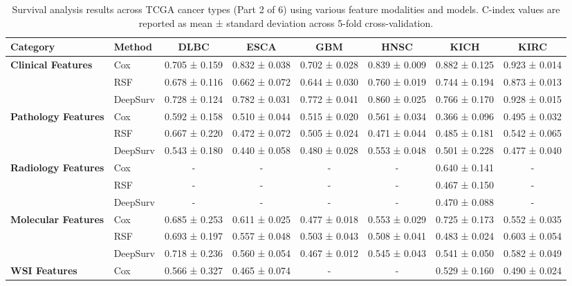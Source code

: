 \begin{sidewaystable}[htbp]
    \centering
    \caption{Survival analysis results across TCGA cancer types (Part 2 of 6) using various feature modalities and models. C-index values are reported as mean ± standard deviation across 5-fold cross-validation.}
    \label{tab:survival_results_2}
    \begin{tabular}{@{}llcccccc@{}}
        \toprule
        \textbf{Category} & \textbf{Method} & \textbf{DLBC} & \textbf{ESCA} & \textbf{GBM} & \textbf{HNSC} & \textbf{KICH} & \textbf{KIRC} \\
        \midrule
        \multirow{3}{*}{\textbf{Clinical Features}} & Cox & 0.705 ± 0.159 & 0.832 ± 0.038 & 0.702 ± 0.028 & 0.839 ± 0.009 & 0.882 ± 0.125 & 0.923 ± 0.014 \\
        & RSF & 0.678 ± 0.116 & 0.662 ± 0.072 & 0.644 ± 0.030 & 0.760 ± 0.019 & 0.744 ± 0.194 & 0.873 ± 0.013 \\
        & DeepSurv & 0.728 ± 0.124 & 0.782 ± 0.031 & 0.772 ± 0.041 & 0.860 ± 0.025 & 0.766 ± 0.170 & 0.928 ± 0.015 \\
        \midrule
        \multirow{3}{*}{\textbf{Pathology Features}} & Cox & 0.592 ± 0.158 & 0.510 ± 0.044 & 0.515 ± 0.020 & 0.561 ± 0.034 & 0.366 ± 0.096 & 0.495 ± 0.032 \\
        & RSF & 0.667 ± 0.220 & 0.472 ± 0.072 & 0.505 ± 0.024 & 0.471 ± 0.044 & 0.485 ± 0.181 & 0.542 ± 0.065 \\
        & DeepSurv & 0.543 ± 0.180 & 0.440 ± 0.058 & 0.480 ± 0.028 & 0.553 ± 0.048 & 0.501 ± 0.228 & 0.477 ± 0.040 \\
        \midrule
        \multirow{3}{*}{\textbf{Radiology Features}} & Cox & - & - & - & - & 0.640 ± 0.141 & - \\
        & RSF & - & - & - & - & 0.467 ± 0.150 & - \\
        & DeepSurv & - & - & - & - & 0.470 ± 0.088 & - \\
        \midrule
        \multirow{3}{*}{\textbf{Molecular Features}} & Cox & 0.685 ± 0.253 & 0.611 ± 0.025 & 0.477 ± 0.018 & 0.553 ± 0.029 & 0.725 ± 0.173 & 0.552 ± 0.035 \\
        & RSF & 0.693 ± 0.197 & 0.557 ± 0.048 & 0.503 ± 0.043 & 0.508 ± 0.041 & 0.483 ± 0.024 & 0.603 ± 0.054 \\
        & DeepSurv & 0.718 ± 0.236 & 0.560 ± 0.054 & 0.467 ± 0.012 & 0.545 ± 0.043 & 0.541 ± 0.050 & 0.582 ± 0.049 \\
        \midrule
        \multirow{3}{*}{\textbf{WSI Features}} & Cox & 0.566 ± 0.327 & 0.465 ± 0.074 & - & - & 0.529 ± 0.160 & 0.490 ± 0.024 \\

\end{tabular}
\end{sidewaystable}
